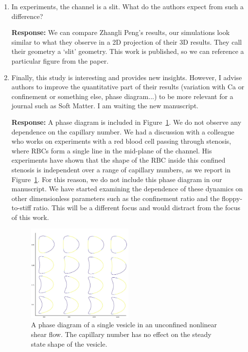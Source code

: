 \documentclass[11pt]{article}
\begin{document}
\begin{enumerate}
\item In experiments, the channel is a slit. What do the authors expect
  from such a difference?

\noindent
{\bf Response:} We can compare Zhangli Peng's results, our simulations
look similar to what they observe in a 2D projection of their 3D
results. They call their geometry a `slit' geometry. This work is
published, so we can reference a particular figure from the paper.

\item Finally, this study is interesting and provides new insights.
  However, I advise authors to improve the quantitative part of their
  results (variation with Ca or confinement or something else, phase
  diagram...) to be more relevant for a journal such as Soft Matter. I
  am waiting the new manuscript.

\noindent
{\bf Response:} A phase diagram is included in Figure~\ref{fig:Phase}.
We do not observe any dependence on the capillary number. We had a
discussion with a colleague who works on experiments
with a red blood cell passing through stenosis, where RBCs form a single line in the mid-plane of the channel.
 His experiments have shown that the
shape of the RBC inside this confined stenosis is independent over a
range of capillary numbers, as we report in Figure~\ref{fig:Phase}. For
this reason, we do not include this phase diagram in our manuscript. We have
started examining the dependence of these dynamics on other
dimensionless parameters such as the confinement ratio and the
floppy-to-stiff ratio. This will be a different focus and would distract
from the focus of this work.
\begin{figure}
\centering
  \includegraphics[width=0.5\textwidth]{phaseDiagram.jpg}
  \caption{\label{fig:Phase} A phase diagram of a single vesicle in an unconfined
  nonlinear shear flow. The capillary number has no effect on the steady
  state shape of the vesicle.}
\end{figure}


\end{enumerate}
\end{document}
